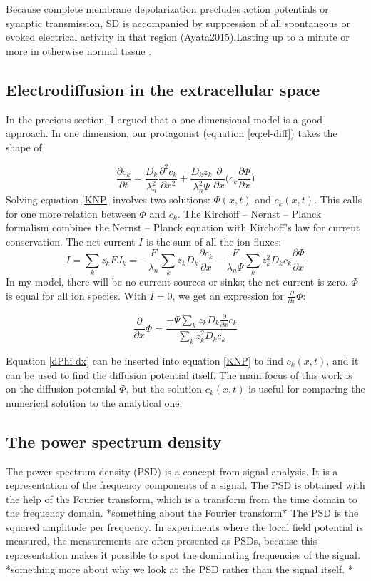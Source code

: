 \documentclass{article}
\begin{document}
Because complete membrane depolarization precludes action potentials or synaptic transmission, SD is accompanied by suppression of all
spontaneous or evoked electrical activity in that region (Ayata2015).Lasting up to a minute or more in otherwise normal tissue .

\subsection{Electrodiffusion in the extracellular space}
In the precious section, I argued that a one-dimensional model is a good approach. 
In one dimension, our protagonist (equation \ref{eq:el-diff}) takes the shape of 

\begin{equation}\label{KNP}
\frac{\partial c_k}{\partial t}= \frac{D_k}{\lambda_n^2} \frac{\partial^2 c_k}{\partial x^2}+\frac{D_k z_k}{\lambda_n^2 \Psi} \frac{\partial }{\partial x}  \bigg(c_k \frac{\partial \Phi}{\partial x} \bigg)
\end{equation}
Solving equation \ref{KNP} involves two solutions: $\Phi (x,t)$ and $c_k(x,t)$. This calls for one more relation between $\Phi$ and $c_k$. The Kirchoff -- Nernst -- Planck formalism combines the Nernst -- Planck equation with Kirchoff's law for current conservation. 
The net current $I$ is the sum of all the ion fluxes:
\begin{equation}
I = \sum_{k}z_k FJ_k = -\frac{F}{\lambda_n}\sum_k z_k D_k  \frac{\partial c_k}{ \partial x} - \frac{F}{\lambda_n \Psi}\sum_k z_k^2D_k c_k \frac{\partial \Phi}{\partial x}
\end{equation}
In my model, there will be no current sources or sinks; the net current is zero. 
$\Phi$ is equal for all ion species. With $I =0$, we get an expression for $ \frac{\partial}{\partial x} \Phi$:

\begin{equation}\label{dPhi dx}
\frac{\partial}{\partial x} \Phi = \frac{-\Psi \sum_k z_k D_k \frac{\partial}{\partial x} c_k}{\sum_k z_k^2 D_k c_k}
\end{equation}

Equation \ref{dPhi dx} can be inserted into equation \ref{KNP} to find $c_k(x,t)$, and it can be used to find the diffusion potential itself. The main focus of this work is on the diffusion potential $\Phi$, but the solution $c_k(x,t)$ is useful for comparing the numerical solution to the analytical one.

\subsection{The power spectrum density}
The power spectrum density (PSD) is a concept from signal analysis. It is a representation of the frequency components of a signal. The PSD is obtained with the help of the Fourier transform, which is a transform from the time domain to the frequency domain. *something about the Fourier transform* The PSD is the squared amplitude per frequency. In experiments where the local field potential is measured, the measurements are often presented as PSDs, because this representation makes it possible to spot the dominating frequencies of the signal. *something more about why we look at the PSD rather than the signal itself. *
\end{document}

